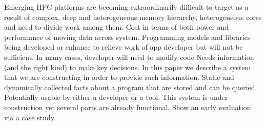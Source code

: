 Emerging HPC platforms are becoming extraordinarily difficult to target as a result of complex, deep  and heterogeneous memory hierarchy, heterogeneous cores and need to divide work among them. Cost in terms of both power and performance of moving data across system.
Programming models and libraries being developed or enhance to relieve work of app developer but will not be sufficient. In many cases, developer will need to modify code
Needs information (and the right kind) to make key decisions.
In this paper we describe a system that we are constructing in order to provide such information. Static and dynamically collected facts about a program that are stored and can be queried. Potentially usable by either a developer or a tool. This system is under construction yet several parts are already functional. 
Show an early evaluation via a case study.
